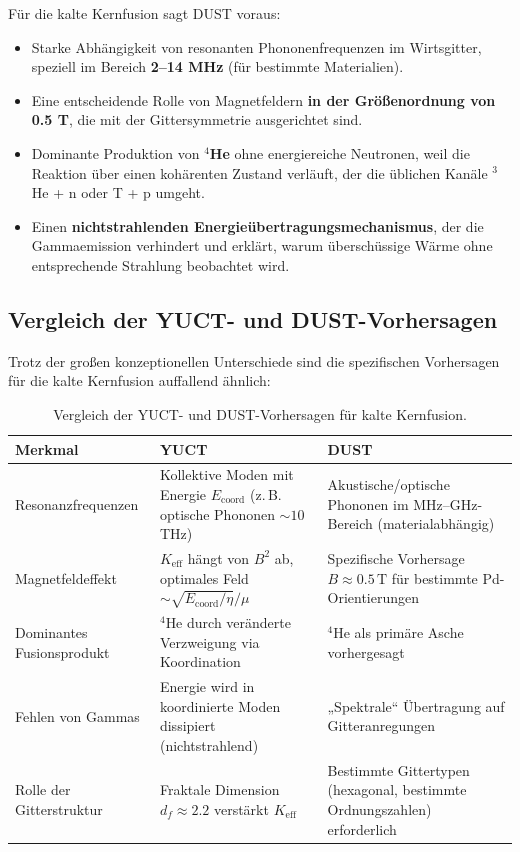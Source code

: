 \documentclass[12pt]{article}
\theoremstyle{remark}
\newcommand{\Keff}{K_{\mathrm{eff}}}
\newcommand{\df}{d_{\!f}}
\begin{document}
	Für die kalte Kernfusion sagt DUST voraus:
	\begin{itemize}
		\item Starke Abhängigkeit von resonanten Phononenfrequenzen im Wirtsgitter, speziell im Bereich \textbf{2–14 MHz} (für bestimmte Materialien).
		\item Eine entscheidende Rolle von Magnetfeldern \textbf{in der Größenordnung von 0.5 T}, die mit der Gittersymmetrie ausgerichtet sind.
		\item Dominante Produktion von \textbf{\(^4\)He} ohne energiereiche Neutronen, weil die Reaktion über einen kohärenten Zustand verläuft, der die üblichen Kanäle \(^3\)He + n oder T + p umgeht.
		\item Einen \textbf{nichtstrahlenden Energieübertragungsmechanismus}, der die Gammaemission verhindert und erklärt, warum überschüssige Wärme ohne entsprechende Strahlung beobachtet wird.
	\end{itemize}
	
	\subsection{Vergleich der YUCT- und DUST-Vorhersagen}
	
	Trotz der großen konzeptionellen Unterschiede sind die spezifischen Vorhersagen für die kalte Kernfusion auffallend ähnlich:
	
	\begin{table}[htbp]
		\centering
		\caption{Vergleich der YUCT- und DUST-Vorhersagen für kalte Kernfusion.}
		\label{tab:comparison}
		\small
		\begin{tabularx}{\textwidth}{l X X}
			\toprule
			\textbf{Merkmal} & \textbf{YUCT} & \textbf{DUST} \\
			\midrule
			Resonanzfrequenzen & Kollektive Moden mit Energie \(E_{\mathrm{coord}}\) (z. B. optische Phononen \(\sim 10\) THz) & Akustische/optische Phononen im MHz–GHz-Bereich (materialabhängig) \\
			Magnetfeldeffekt & \(\Keff\) hängt von \(B^2\) ab, optimales Feld \(\sim \sqrt{E_{\mathrm{coord}}/\eta}/\mu\) & Spezifische Vorhersage \(B \approx 0.5\,\text{T}\) für bestimmte Pd-Orientierungen \\
			Dominantes Fusionsprodukt & \(^4\)He durch veränderte Verzweigung via Koordination & \(^4\)He als primäre Asche vorhergesagt \\
			Fehlen von Gammas & Energie wird in koordinierte Moden dissipiert (nichtstrahlend) & „Spektrale“ Übertragung auf Gitteranregungen \\
			Rolle der Gitterstruktur & Fraktale Dimension \(\df \approx 2.2\) verstärkt \(\Keff\) & Bestimmte Gittertypen (hexagonal, bestimmte Ordnungszahlen) erforderlich \\
			\bottomrule
		\end{tabularx}
	\end{table}
	
\end{document}
